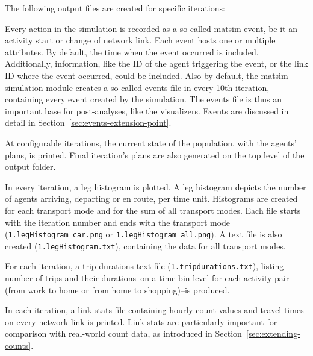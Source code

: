 The following output files are created for specific iterations:
\begin{description}\styleDescription

\item[Events:] Every action in the simulation is recorded as a so-called \gls{matsim} \gls{event}, be it an activity start or change of network link. Each \gls{event} hosts one or multiple attributes. By default, the time when the \gls{event} occurred is included. Additionally, information, like the ID of the agent triggering the event, or the link ID where the \gls{event} occurred, could be included. Also by default, the \gls{matsim} simulation module creates a so-called events file in every 10th iteration, containing every \gls{event}  created by the simulation. The events file is thus an important base for post-analyses, like the visualizers. Events are discussed in detail in Section~\ref{sec:events-extension-point}.

\item[Plans:] At configurable iterations, the current state of the population, with the agents' plans, is printed.
%
Final iteration's plans 
are also generated on the top level of the output folder.

\item[Leg Histogram:]
In every iteration, a leg histogram is plotted. A leg histogram depicts the number of agents arriving, departing or en route, per time unit. Histograms are created for each transport mode and for the sum of all transport modes. Each file starts with the iteration number and ends with the transport mode (\eg \lstinline|1.legHistogram_car.png| or \lstinline|1.legHistogram_all.png|). A text file is also created (\eg \lstinline|1.legHistogram.txt|), containing the data for all transport modes.

\item[Trip Durations:]
For each iteration, a \gls{trip} durations text file (\eg \lstinline|1.tripdurations.txt|), listing number of trips and their durations--on a time bin level for each activity pair (\eg from work to home or from home to shopping)--is produced.

\item[Link Stats:] In each iteration, a link stats file containing hourly count values and travel times on every network link is printed. Link stats are particularly important for comparison with real-world count data, as introduced in Section~\ref{sec:extending-counts}.

%
\end{description}

